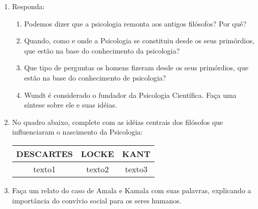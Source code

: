 \documentclass[a4paper, 12pt]{article}
\begin{document}
 \begin{enumerate}
   \item Responda:
     \begin{enumerate}
      \item Podemos dizer que a psicologia remonta aos antigos filósofos? Por quê?
      \item Quando, como e onde a Psicologia se constituiu desde os seus primórdios, que estão na base do conhecimento da psicologia?
      \item Que tipo de perguntas os homens fizeram desde os seus primórdios, que estão na base do conhecimento de psicologia?
      \item Wundt é considerado o fundador da Psicologia Científica. Faça uma síntese sobre ele e suas idéias.
     \end{enumerate}
   \item No quadro abaixo, complete com as idéias centrais dos filósofos que influenciaram o nascimento da Psicologia: \newline \newline
     \centering
     \begin{tabular}{|c|c|c|}
     \hline
     \textbf{DESCARTES} & \textbf{LOCKE} & \textbf{KANT} \\ \hline
     texto1 & texto2 & texto3 \\ \hline
     \end{tabular} \newline
   \item Faça um relato do caso de Amala e Kamala com suas palavras, explicando a importância do convívio social para os seres humanos.
 \end{enumerate}
\end{document}
